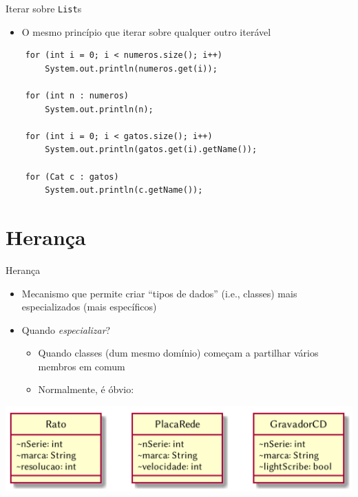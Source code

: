 \documentclass[portuguese, aspectratio=169, xcolor=table]{beamer}
\begin{document}
\begin{frame}[fragile]{Iterar sobre \texttt{List}s}
 \begin{itemize}
     \item O mesmo princípio que iterar sobre qualquer outro iterável
 \end{itemize}
\begin{verbatim}
    for (int i = 0; i < numeros.size(); i++)
        System.out.println(numeros.get(i));
    
    for (int n : numeros)
        System.out.println(n);

    for (int i = 0; i < gatos.size(); i++)
        System.out.println(gatos.get(i).getName());
    
    for (Cat c : gatos)
        System.out.println(c.getName());
\end{verbatim}
\end{frame}

\section{Herança}

\begin{frame}{Herança}
\begin{itemize}
    \item Mecanismo que permite criar ``tipos de dados'' (i.e., classes) mais especializados (mais específicos)
    \item Quando \textit{especializar}?
    \begin{itemize}
        \item Quando classes (dum mesmo domínio) começam a partilhar vários membros em comum 
        \item Normalmente, é óbvio:
    \end{itemize} 
\end{itemize}
\begin{center}
    \includegraphics[width=0.5\linewidth]{./uml_diagrams/class7}
\end{center}
\end{frame}
\end{document}
